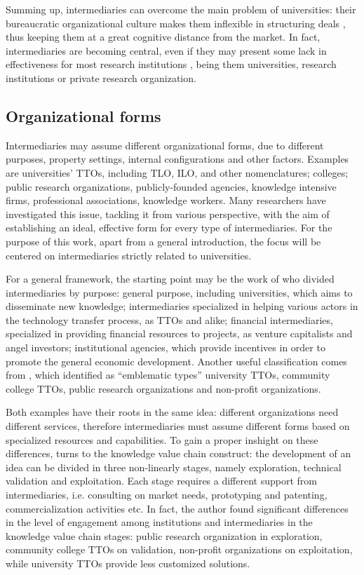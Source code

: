 Summing up, intermediaries can overcome the main problem of universities: their bureaucratic organizational culture makes them inflexible in structuring deals \citep{Siegel2003a}, thus keeping them at a great cognitive distance from the market. In fact, intermediaries are becoming central, even if they may present some lack in effectiveness for most research institutions \citep{Geuna2009}, being them universities, research institutions or private research organization.

\subsection{Organizational forms}

Intermediaries may assume different organizational forms, due to different purposes, property settings, internal configurations and other factors. Examples are universities' TTOs, including TLO, ILO, and other nomenclatures; colleges; public research organizations, publicly-founded agencies, knowledge intensive firms, professional associations, knowledge workers. Many researchers have investigated this issue, tackling it from various perspective, with the aim of establishing an ideal, effective form for every type of intermediaries. For the purpose of this work, apart from a general introduction, the focus will be centered on intermediaries strictly related to universities.

For a general framework, the starting point may be the work of \citet{Yusuf2008} who divided intermediaries by purpose: general purpose, including universities, which aims to disseminate new knowledge; intermediaries specialized in helping various actors in the technology transfer process, as TTOs and alike; financial intermediaries, specialized in providing financial resources to projects, as venture capitalists and angel investors; institutional agencies, which provide incentives in order to promote the general economic development. Another useful classification comes from \citet{Landry2013}, which identified as \enquote{emblematic types} university TTOs, community college TTOs, public research organizations and non-profit organizations.

Both examples have their roots in the same idea: different organizations need different services, therefore intermediaries must assume different forms based on specialized resources and capabilities. To gain a proper inshight on these differences, \citet{Landry2013} turns to the knowledge value chain construct: the development of an idea can be divided in three non-linearly stages, namely exploration, technical validation and exploitation. Each stage requires a different support from intermediaries, i.e. consulting on market needs, prototyping and patenting, commercialization activities etc. In fact, the author found significant differences in the level of engagement among institutions and intermediaries in the knowledge value chain stages: public research organization in exploration, community college TTOs on validation, non-profit organizations on exploitation, while university TTOs provide less customized solutions.

